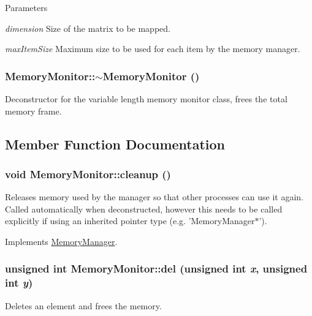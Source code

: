 \begin{DoxyParams}{Parameters}
\item[{\em dimension}]Size of the matrix to be mapped. \item[{\em maxItemSize}]Maximum size to be used for each item by the memory manager. \end{DoxyParams}
\hypertarget{classMemoryMonitor_a0286650da6c61e8c37bb7b8238f9b08b}{
\subsubsection[{$\sim$MemoryMonitor}]{\setlength{\rightskip}{0pt plus 5cm}MemoryMonitor::$\sim$MemoryMonitor ()}}
\label{classMemoryMonitor_a0286650da6c61e8c37bb7b8238f9b08b}
Deconstructor for the variable length memory monitor class, frees the total memory frame. 

\subsection{Member Function Documentation}
\hypertarget{classMemoryMonitor_ac31e19cbcae35d0fb865c3380f355e37}{
\subsubsection[{cleanup}]{\setlength{\rightskip}{0pt plus 5cm}void MemoryMonitor::cleanup ()}}
\label{classMemoryMonitor_ac31e19cbcae35d0fb865c3380f355e37}
Releases memory used by the manager so that other processes can use it again. Called automatically when deconstructed, however this needs to be called explicitly if using an inherited pointer type (e.g. 'MemoryManager$\ast$'). 

Implements \hyperlink{classMemoryManager_ab24d56675e49909dfa6ccc67163d9add}{MemoryManager}.

\hypertarget{classMemoryMonitor_a6ebe27bc008fb68397d9f400c0745c5d}{
\subsubsection[{del}]{\setlength{\rightskip}{0pt plus 5cm}unsigned int MemoryMonitor::del (unsigned int {\em x}, \/  unsigned int {\em y})}}
\label{classMemoryMonitor_a6ebe27bc008fb68397d9f400c0745c5d}
Deletes an element and frees the memory.


